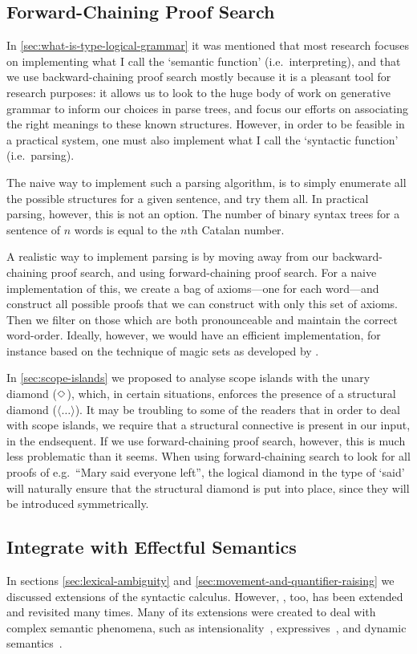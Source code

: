 \subsection*{Forward-Chaining Proof Search}
In \autoref{sec:what-is-type-logical-grammar} it was mentioned that
most research focuses on implementing what I call the `semantic
function' (i.e.\ interpreting), and that we use backward-chaining
proof search mostly because it is a pleasant tool for research
purposes:
it allows us to look to the huge body of work on generative grammar to
inform our choices in parse trees, and focus our efforts on
associating the right meanings to these known structures.
However, in order to be feasible in a practical system, one must also
implement what I call the `syntactic function' (i.e.\ parsing).

The naive way to implement such a parsing algorithm, is to simply
enumerate all the possible structures for a given sentence, and try
them all. In practical parsing, however, this is not an option. The
number of binary syntax trees for a sentence of $n$ words is equal to
the $n$th Catalan number.

A realistic way to implement parsing is by moving away from our
backward-chaining proof search, and using forward-chaining proof
search. For a naive implementation of this, we create a bag of
axioms---one for each word---and construct all possible proofs that we
can construct with only this set of axioms. Then we filter on those
which are both pronounceable and maintain the correct
word-order. Ideally, however, we would have an efficient
implementation, for instance based on the technique of magic sets as
developed by \citet{bancilhon1985}.

In \autoref{sec:scope-islands} we proposed to analyse scope islands
with the unary diamond ($\Diamond$), which, in certain situations, enforces
the presence of a structural diamond ($\langle\ldots\rangle$).
It may be troubling to some of the readers that in order to deal with
scope islands, we require that a structural connective is present in
our input, in the endsequent.
If we use forward-chaining proof search, however, this is much less
problematic than it seems. When using forward-chaining search to look
for all proofs of e.g.\ ``Mary said everyone left'', the logical
diamond in the type of `said' will naturally ensure that the
structural diamond is put into place, since they will be introduced
symmetrically.


\subsection*{Integrate with Effectful Semantics}
In sections \ref{sec:lexical-ambiguity} and
\ref{sec:movement-and-quantifier-raising} we discussed extensions of
the syntactic calculus. However, \lamET, too, has been extended and
revisited many times. Many of its extensions were created to deal with
complex semantic phenomena, such as intensionality~\citep{winter2009},
expressives~\citep{potts2003,mccready2010,gutzmann2011}, and dynamic
semantics~\citep{groenendijk1995}.

